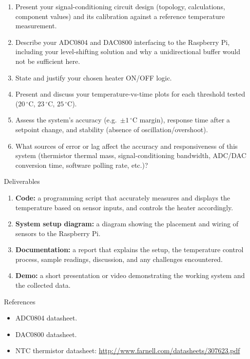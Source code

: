 \begin{reportq}
  \begin{enumerate}
    \item Present your signal-conditioning circuit design (topology, calculations, component values) and its calibration against a reference temperature measurement.
    \item Describe your ADC0804 and DAC0800 interfacing to the Raspberry Pi, including your level-shifting solution and why a unidirectional buffer would not be sufficient here.
    \item State and justify your chosen heater ON/OFF logic.
    \item Present and discuss your temperature-vs-time plots for each threshold tested ($20\,^{\circ}\text{C}$, $23\,^{\circ}\text{C}$, $25\,^{\circ}\text{C}$).
    \item Assess the system's accuracy (e.g.\ $\pm 1\,^{\circ}\text{C}$ margin), response time after a setpoint change, and stability (absence of oscillation/overshoot).
    \item What sources of error or lag affect the accuracy and responsiveness of this system (thermistor thermal mass, signal-conditioning bandwidth, ADC/DAC conversion time, software polling rate, etc.)?
  \end{enumerate}
\end{reportq}

\begin{labsection}{Deliverables}{}
  \begin{enumerate}
    \item \textbf{Code:} a programming script that accurately measures and displays the temperature based on sensor inputs, and controls the heater accordingly.
    \item \textbf{System setup diagram:} a diagram showing the placement and wiring of sensors to the Raspberry Pi.
    \item \textbf{Documentation:} a report that explains the setup, the temperature control process, sample readings, discussion, and any challenges encountered.
    \item \textbf{Demo:} a short presentation or video demonstrating the working system and the collected data.
  \end{enumerate}
\end{labsection}

\begin{labsection}{References}{}
  \begin{itemize}
    \item ADC0804 datasheet.
    \item DAC0800 datasheet.
    \item NTC thermistor datasheet: \url{http://www.farnell.com/datasheets/307623.pdf}
  \end{itemize}
\end{labsection}
